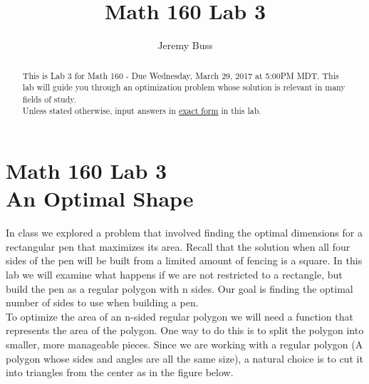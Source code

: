\documentclass[handout,nooutcomes]{ximera}
\title{Math 160 Lab 3}
\author{Jeremy Buss} %
\begin{document}
\section{Math 160 Lab 3 \\ An Optimal Shape}

\begin{abstract}
This is Lab 3 for Math 160 - Due Wednesday, March 29, 2017 at 5:00PM MDT.
This lab will guide you through an optimization problem whose solution is relevant in many fields of study.\\

Unless stated otherwise, input answers in \underline{exact form} in this lab.
\end{abstract}

\maketitle

\hspace{2cm}In class we explored a problem that involved finding the optimal dimensions for a rectangular pen that maximizes its area. Recall that the solution when all four sides of the pen will be built from a limited amount of fencing is a square. In this lab we will examine what happens if we are not restricted to a rectangle, but build the pen as a regular polygon with n sides. Our goal is finding the optimal number of sides to use when building a pen.\\

\medskip
\hspace{2cm}To optimize the area of an n-sided regular polygon we will need a function that represents the area of the polygon. One way to do this is to split the polygon into smaller, more manageable pieces. Since we are working with a regular polygon (A polygon whose sides and angles are all the same size), a natural choice is to cut it into triangles from the center as in the figure below.

\end{document}
